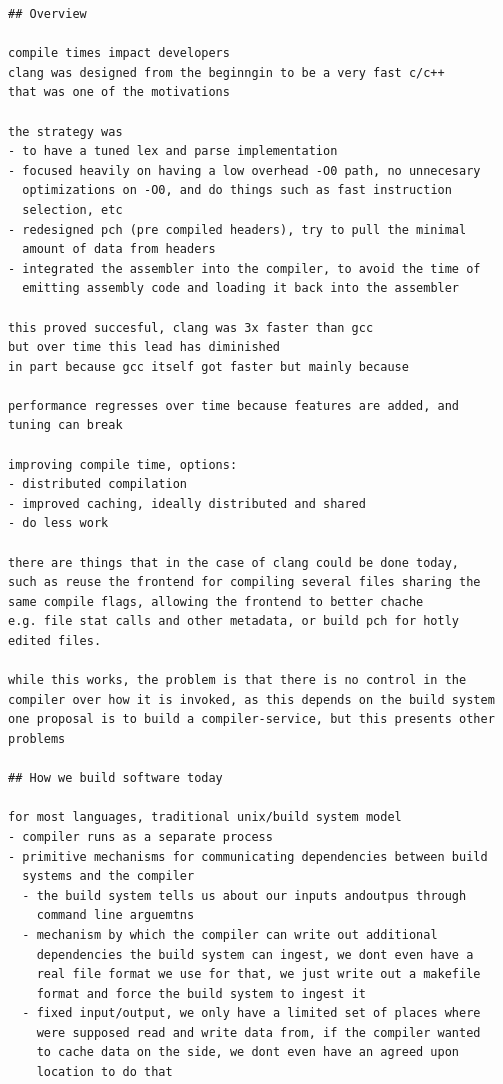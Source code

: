 \documentclass[12pt, a4paper]{report}
\begin{document}
\begin{verbatim}
## Overview

compile times impact developers
clang was designed from the beginngin to be a very fast c/c++
that was one of the motivations

the strategy was
- to have a tuned lex and parse implementation
- focused heavily on having a low overhead -O0 path, no unnecesary
  optimizations on -O0, and do things such as fast instruction
  selection, etc
- redesigned pch (pre compiled headers), try to pull the minimal
  amount of data from headers
- integrated the assembler into the compiler, to avoid the time of
  emitting assembly code and loading it back into the assembler

this proved succesful, clang was 3x faster than gcc
but over time this lead has diminished
in part because gcc itself got faster but mainly because

performance regresses over time because features are added, and
tuning can break

improving compile time, options:
- distributed compilation
- improved caching, ideally distributed and shared
- do less work

there are things that in the case of clang could be done today,
such as reuse the frontend for compiling several files sharing the
same compile flags, allowing the frontend to better chache
e.g. file stat calls and other metadata, or build pch for hotly
edited files.

while this works, the problem is that there is no control in the
compiler over how it is invoked, as this depends on the build system
one proposal is to build a compiler-service, but this presents other
problems

## How we build software today

for most languages, traditional unix/build system model
- compiler runs as a separate process
- primitive mechanisms for communicating dependencies between build
  systems and the compiler
  - the build system tells us about our inputs andoutpus through
    command line arguemtns
  - mechanism by which the compiler can write out additional
    dependencies the build system can ingest, we dont even have a
    real file format we use for that, we just write out a makefile
    format and force the build system to ingest it
  - fixed input/output, we only have a limited set of places where
    were supposed read and write data from, if the compiler wanted
    to cache data on the side, we dont even have an agreed upon
    location to do that


\end{verbatim}
\end{document}
